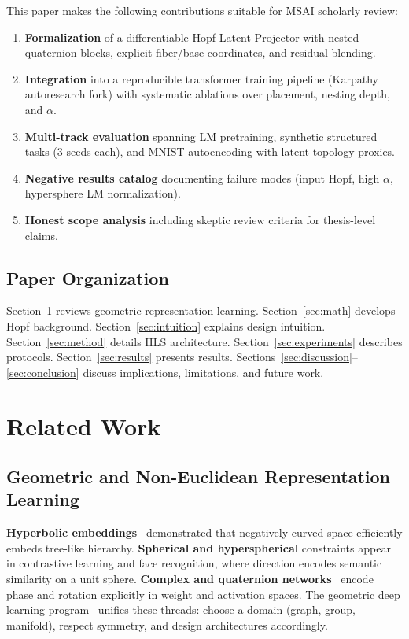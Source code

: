 \documentclass[11pt,twocolumn]{article}
\begin{document}
This paper makes the following contributions suitable for MSAI scholarly review:
\begin{enumerate}[leftmargin=*]
  \item \textbf{Formalization} of a differentiable Hopf Latent Projector with nested quaternion blocks, explicit fiber/base coordinates, and residual blending.
  \item \textbf{Integration} into a reproducible transformer training pipeline (Karpathy autoresearch fork) with systematic ablations over placement, nesting depth, and $\alpha$.
  \item \textbf{Multi-track evaluation} spanning LM pretraining, synthetic structured tasks (3 seeds each), and MNIST autoencoding with latent topology proxies.
  \item \textbf{Negative results catalog} documenting failure modes (input Hopf, high $\alpha$, hypersphere LM normalization).
  \item \textbf{Honest scope analysis} including skeptic review criteria for thesis-level claims.
\end{enumerate}

\subsection{Paper Organization}

Section~\ref{sec:related} reviews geometric representation learning. Section~\ref{sec:math} develops Hopf background. Section~\ref{sec:intuition} explains design intuition. Section~\ref{sec:method} details HLS architecture. Section~\ref{sec:experiments} describes protocols. Section~\ref{sec:results} presents results. Sections~\ref{sec:discussion}--\ref{sec:conclusion} discuss implications, limitations, and future work.

\section{Related Work}
\label{sec:related}

\subsection{Geometric and Non-Euclidean Representation Learning}

\textbf{Hyperbolic embeddings}~\cite{nickel2017,ganea2018} demonstrated that negatively curved space efficiently embeds tree-like hierarchy. \textbf{Spherical and hyperspherical} constraints appear in contrastive learning and face recognition, where direction encodes semantic similarity on a unit sphere. \textbf{Complex and quaternion networks}~\cite{trabelsi2018} encode phase and rotation explicitly in weight and activation spaces. The geometric deep learning program~\cite{bronstein2021} unifies these threads: choose a domain (graph, group, manifold), respect symmetry, and design architectures accordingly.
\end{document}
